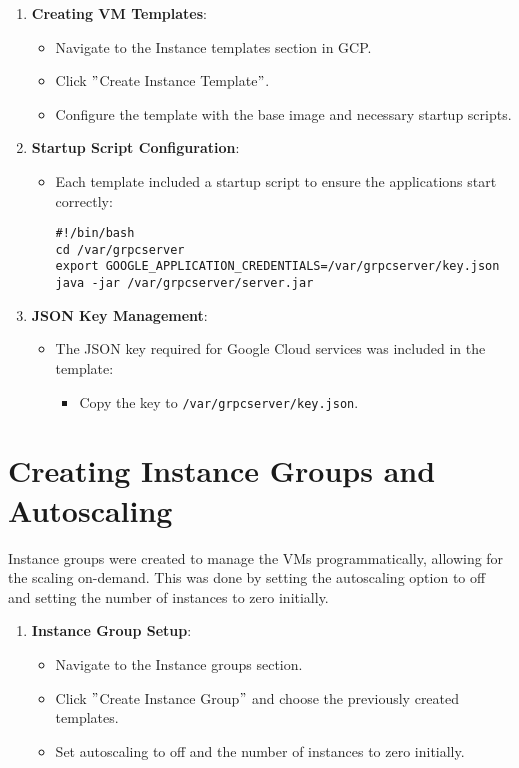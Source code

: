 \begin{enumerate}
    \item \textbf{Creating VM Templates}:
    \begin{itemize}
        \item Navigate to the Instance templates section in GCP.
        \item Click \("\)Create Instance Template\("\).
        \item Configure the template with the base image and necessary startup scripts.
    \end{itemize}

    \item \textbf{Startup Script Configuration}:
    \begin{itemize}
        \item Each template included a startup script to ensure the applications start correctly:
        \begin{verbatim}
#!/bin/bash
cd /var/grpcserver
export GOOGLE_APPLICATION_CREDENTIALS=/var/grpcserver/key.json
java -jar /var/grpcserver/server.jar
        \end{verbatim}
    \end{itemize}

    \item \textbf{JSON Key Management}:
    \begin{itemize}
        \item The JSON key required for Google Cloud services was included in the template:
        \begin{itemize}
            \item Copy the key to \texttt{/var/grpcserver/key.json}.
        \end{itemize}
    \end{itemize}
\end{enumerate}


\section{Creating Instance Groups and Autoscaling}\label{sec:creating-instance-groups-and-autoscaling}

Instance groups were created to manage the VMs programmatically, allowing for the scaling on-demand.
This was done by setting the autoscaling option to off and setting the number of instances to zero initially.

\begin{enumerate}
    \item \textbf{Instance Group Setup}:
    \begin{itemize}
        \item Navigate to the Instance groups section.
        \item Click \("\)Create Instance Group\("\) and choose the previously created templates.
        \item Set autoscaling to off and the number of instances to zero initially.
    \end{itemize}
\end{enumerate}


